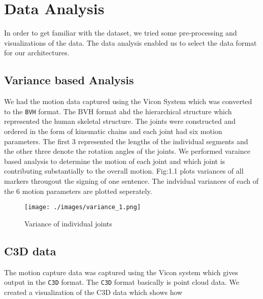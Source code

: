 \chapter{Data Analysis}

In order to get familiar with the dataset, we tried some pre-processing and visualizations of the data. The data analysis enabled us to select the data format for our architectures. 

\section{Variance based Analysis}
We had the motion data captured using the Vicon System which was converted to the \texttt{BVH} format. The BVH format ahd the hierarchical structure which represented the human skeletal structure. The joints were constructed and ordered in the form of kinematic chains and each joint had six motion parameters. The first 3 represented the lengths of the individual segments and the other three denote the rotation angles of the joints. We performed varaince based analysis to determine the motion of each joint and which joint is contributing substantially to the overall motion.  
Fig:1.1 plots variances of all markers througout the signing of one sentence. The indvidual variances of each of the 6 motion parameters are plotted seperately.  
\begin{figure}[h!]
	\texttt{[image: ./images/variance\_1.png]}
	\caption{ Variance of individual joints }
	\label{fig:1.1}
\end{figure}

\section{C3D data}

The motion capture data was captured using the Vicon system which gives output in the \texttt{C3D} format. The \texttt{C3D} format basically is point cloud data. We created a visualization of the C3D data which shows how  

